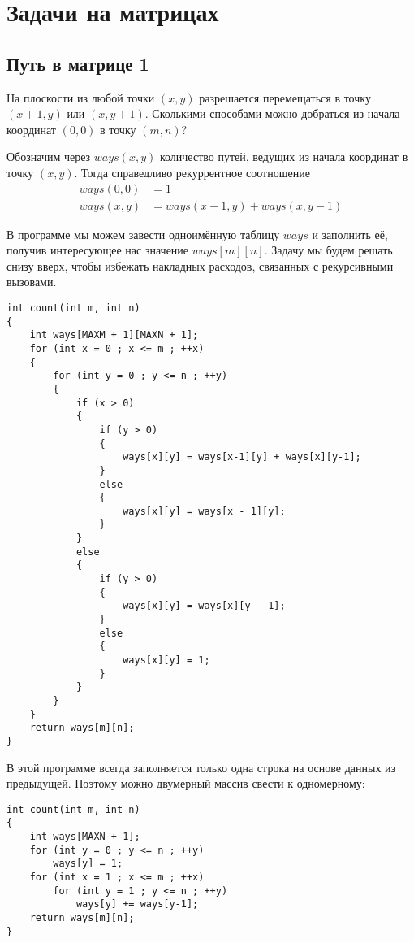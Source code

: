 \documentclass[14pt,openany]{book}
\begin{document}
\chapter{Задачи на матрицах}

\section{Путь в матрице 1}

На плоскости из любой точки $(x, y)$ разрешается перемещаться в точку $(x+1,y)$ или $(x,y+1)$.
Сколькими способами можно добраться из начала координат $(0,0)$ в точку $(m,n)$?

Обозначим через $ways(x,y)$ количество путей, ведущих из начала координат в точку $(x,y)$.
Тогда справедливо рекуррентное соотношение
\begin{align*}
ways(0,0) &= 1 \\
ways(x,y) &= ways(x-1,y) + ways(x,y-1)
\end{align*}

В программе мы можем завести одноимённую таблицу $ways$ и заполнить её, получив интересующее
нас значение $ways[m][n]$. Задачу мы будем решать снизу вверх, чтобы избежать накладных
расходов, связанных с рекурсивными вызовами.

\begin{lstlisting}
int count(int m, int n)
{
    int ways[MAXM + 1][MAXN + 1];
    for (int x = 0 ; x <= m ; ++x)
    {
        for (int y = 0 ; y <= n ; ++y)
        {
            if (x > 0)
            {
                if (y > 0)
	            {
                    ways[x][y] = ways[x-1][y] + ways[x][y-1];
	            }
                else
                {
                    ways[x][y] = ways[x - 1][y];
                }
            }
            else
            {
                if (y > 0)
                {
                    ways[x][y] = ways[x][y - 1];
                }
                else
                {
                    ways[x][y] = 1;
                }
            }
        }
    }
    return ways[m][n];
}
\end{lstlisting}

В этой программе всегда заполняется только одна строка на основе данных из предыдущей.
Поэтому можно двумерный массив свести к одномерному:

\begin{lstlisting}
int count(int m, int n)
{
    int ways[MAXN + 1];
    for (int y = 0 ; y <= n ; ++y)
        ways[y] = 1;
    for (int x = 1 ; x <= m ; ++x)
        for (int y = 1 ; y <= n ; ++y)
       	    ways[y] += ways[y-1];
    return ways[m][n];
}
\end{lstlisting}
\end{document}
